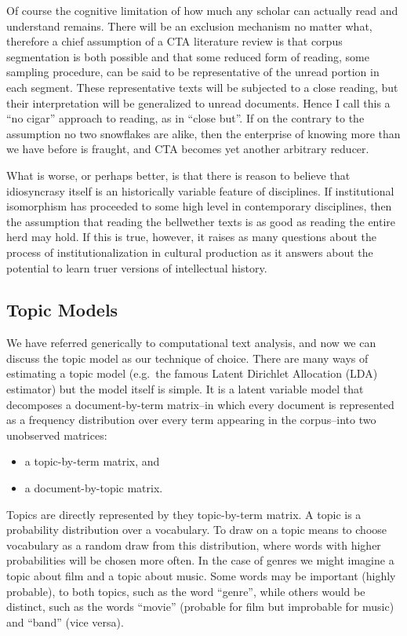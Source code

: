 \documentclass[]{book}
\providecommand{\tightlist}{%
  \setlength{\itemsep}{0pt}\setlength{\parskip}{0pt}}
\theoremstyle{definition}
\theoremstyle{definition}
\theoremstyle{definition}
\theoremstyle{remark}
\begin{document}
Of course the cognitive limitation of how much any scholar can actually
read and understand remains. There will be an exclusion mechanism no
matter what, therefore a chief assumption of a CTA literature review is
that corpus segmentation is both possible and that some reduced form of
reading, some sampling procedure, can be said to be representative of
the unread portion in each segment. These representative texts will be
subjected to a close reading, but their interpretation will be
generalized to unread documents. Hence I call this a ``no cigar''
approach to reading, as in ``close but''. If on the contrary to the
assumption no two snowflakes are alike, then the enterprise of knowing
more than we have before is fraught, and CTA becomes yet another
arbitrary reducer.

What is worse, or perhaps better, is that there is reason to believe
that idiosyncrasy itself is an historically variable feature of
disciplines. If institutional isomorphism has proceeded to some high
level in contemporary disciplines, then the assumption that reading the
bellwether texts is as good as reading the entire herd may hold. If this
is true, however, it raises as many questions about the process of
institutionalization in cultural production as it answers about the
potential to learn truer versions of intellectual history.

\hypertarget{topic-models}{%
\subsection{Topic Models}\label{topic-models}}

We have referred generically to computational text analysis, and now we
can discuss the topic model as our technique of choice. There are many
ways of estimating a topic model (e.g.~the famous Latent Dirichlet
Allocation (LDA) estimator) but the model itself is simple. It is a
latent variable model that decomposes a document-by-term matrix--in
which every document is represented as a frequency distribution over
every term appearing in the corpus--into two unobserved matrices:

\begin{itemize}
\tightlist
\item
  a topic-by-term matrix, and
\item
  a document-by-topic matrix.
\end{itemize}

Topics are directly represented by they topic-by-term matrix. A topic is
a probability distribution over a vocabulary. To draw on a topic means
to choose vocabulary as a random draw from this distribution, where
words with higher probabilities will be chosen more often. In the case
of genres we might imagine a topic about film and a topic about music.
Some words may be important (highly probable), to both topics, such as
the word ``genre'', while others would be distinct, such as the words
``movie'' (probable for film but improbable for music) and ``band''
(vice versa).
\end{document}
